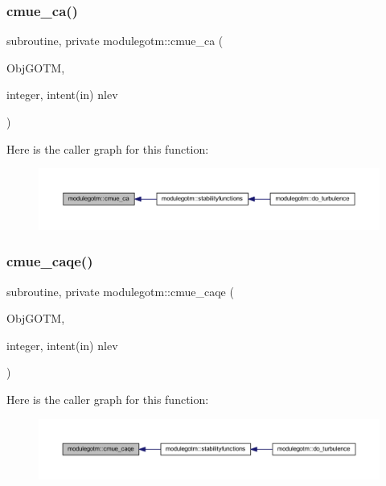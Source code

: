 \subsubsection{\texorpdfstring{cmue\+\_\+ca()}{cmue\_ca()}}
{\footnotesize\ttfamily subroutine, private modulegotm\+::cmue\+\_\+ca (\begin{DoxyParamCaption}\item[{}]{Obj\+G\+O\+TM,  }\item[{integer, intent(in)}]{nlev }\end{DoxyParamCaption})\hspace{0.3cm}{\ttfamily [private]}}

Here is the caller graph for this function\+:\nopagebreak
\begin{figure}[H]
\begin{center}
\leavevmode
\includegraphics[width=350pt]{namespacemodulegotm_a8f3eabf069e4530d9ca2df0e3228c074_icgraph}
\end{center}
\end{figure}
\mbox{\label{namespacemodulegotm_a38a0c42b81c2a8bae8ae60d20ed0df23}} 
\subsubsection{\texorpdfstring{cmue\+\_\+caqe()}{cmue\_caqe()}}
{\footnotesize\ttfamily subroutine, private modulegotm\+::cmue\+\_\+caqe (\begin{DoxyParamCaption}\item[{}]{Obj\+G\+O\+TM,  }\item[{integer, intent(in)}]{nlev }\end{DoxyParamCaption})\hspace{0.3cm}{\ttfamily [private]}}

Here is the caller graph for this function\+:\nopagebreak
\begin{figure}[H]
\begin{center}
\leavevmode
\includegraphics[width=350pt]{namespacemodulegotm_a38a0c42b81c2a8bae8ae60d20ed0df23_icgraph}
\end{center}
\end{figure}
\mbox{\label{namespacemodulegotm_a2b38e80c2393abb45f25640cd3fda481}} 
